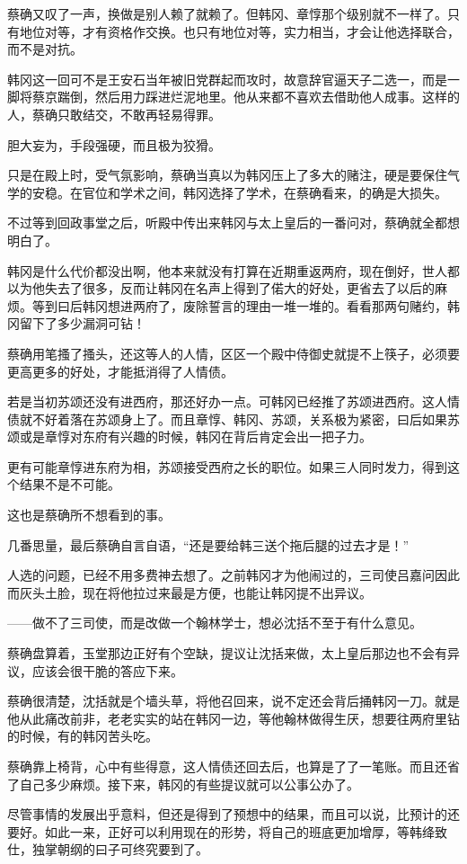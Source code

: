 蔡确又叹了一声，换做是别人赖了就赖了。但韩冈、章惇那个级别就不一样了。只有地位对等，才有资格作交换。也只有地位对等，实力相当，才会让他选择联合，而不是对抗。

韩冈这一回可不是王安石当年被旧党群起而攻时，故意辞官逼天子二选一，而是一脚将蔡京踹倒，然后用力踩进烂泥地里。他从来都不喜欢去借助他人成事。这样的人，蔡确只敢结交，不敢再轻易得罪。

胆大妄为，手段强硬，而且极为狡猾。

只是在殿上时，受气氛影响，蔡确当真以为韩冈压上了多大的赌注，硬是要保住气学的安稳。在官位和学术之间，韩冈选择了学术，在蔡确看来，的确是大损失。

不过等到回政事堂之后，听殿中传出来韩冈与太上皇后的一番问对，蔡确就全都想明白了。

韩冈是什么代价都没出啊，他本来就没有打算在近期重返两府，现在倒好，世人都以为他失去了很多，反而让韩冈在名声上得到了偌大的好处，更省去了以后的麻烦。等到曰后韩冈想进两府了，废除誓言的理由一堆一堆的。看看那两句赌约，韩冈留下了多少漏洞可钻！

蔡确用笔搔了搔头，还这等人的人情，区区一个殿中侍御史就提不上筷子，必须要更高更多的好处，才能抵消得了人情债。

若是当初苏颂还没有进西府，那还好办一点。可韩冈已经推了苏颂进西府。这人情债就不好着落在苏颂身上了。而且章惇、韩冈、苏颂，关系极为紧密，曰后如果苏颂或是章惇对东府有兴趣的时候，韩冈在背后肯定会出一把子力。

更有可能章惇进东府为相，苏颂接受西府之长的职位。如果三人同时发力，得到这个结果不是不可能。

这也是蔡确所不想看到的事。

几番思量，最后蔡确自言自语，“还是要给韩三送个拖后腿的过去才是！”

人选的问题，已经不用多费神去想了。之前韩冈才为他闹过的，三司使吕嘉问因此而灰头土脸，现在将他拉过来最是方便，也能让韩冈提不出异议。

——做不了三司使，而是改做一个翰林学士，想必沈括不至于有什么意见。

蔡确盘算着，玉堂那边正好有个空缺，提议让沈括来做，太上皇后那边也不会有异议，应该会很干脆的答应下来。

蔡确很清楚，沈括就是个墙头草，将他召回来，说不定还会背后捅韩冈一刀。就是他从此痛改前非，老老实实的站在韩冈一边，等他翰林做得生厌，想要往两府里钻的时候，有的韩冈苦头吃。

蔡确靠上椅背，心中有些得意，这人情债还回去后，也算是了了一笔账。而且还省了自己多少麻烦。接下来，韩冈的有些提议就可以公事公办了。

尽管事情的发展出乎意料，但还是得到了预想中的结果，而且可以说，比预计的还要好。如此一来，正好可以利用现在的形势，将自己的班底更加增厚，等韩绛致仕，独掌朝纲的曰子可终究要到了。

